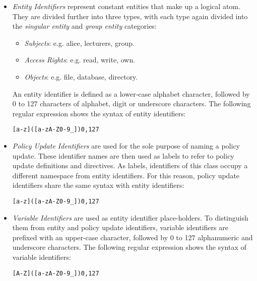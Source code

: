 \documentclass[11pt, twocolumn]{article}
\newenvironment{vverbatim}
  {\begin{alltt}}
  {\vspace{-\baselineskip}\end{alltt}}
\begin{document}
          \begin{itemize}
            \item
              {\em Entity Identifiers} represent constant entities that make up
              a logical atom. They are divided further into three types, with
              each type again divided into the {\em singular entity} and
              {\em group entity} categories:

              \begin{itemize}
                \item
                  {\em Subjects}: e.g. alice, lecturers, group.
                \item
                  {\em Access Rights}: e.g. read, write, own.
                \item
                  {\em Objects}: e.g. file, database, directory.
              \end{itemize}

              An entity identifier is defined as a lower-case alphabet
              character, followed by 0 to 127 characters of alphabet, digit or
              underscore characters. The following regular expression shows the
              syntax of entity identifiers:

              \begin{vverbatim}
  [a-z]([a-zA-Z0-9\_]){0,127}
              \end{vverbatim}

            \item
              {\em Policy Update Identifiers} are used for the sole purpose of
              naming a policy update. These identifier names are then used as
              labels to refer to policy update definitions and directives. As
              labels, identifiers of this class occupy a different namespace
              from entity identifiers. For this reason, policy update
              identifiers share the same syntax with entity identifiers:


              \begin{vverbatim}
  [a-z]([a-zA-Z0-9\_]){0,127}
              \end{vverbatim}

            \item
              {\em Variable Identifiers} are used as entity identifier
              place-holders. To distinguish them from entity and policy update
              identifiers, variable identifiers are prefixed with an upper-case
              character, followed by 0 to 127 alphanumeric and underscore
              characters. The following regular expression shows the syntax of
              variable identifiers:

              \begin{vverbatim}
  [A-Z]([a-zA-Z0-9\_]){0,127}
              \end{vverbatim}
          \end{itemize}
\end{document}
